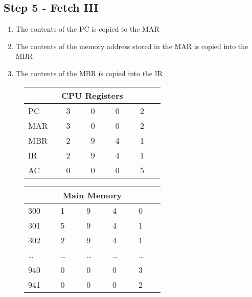 \subsection*{Step 5 - Fetch III}
\begin{enumerate}
    \item The contents of the PC is copied to the MAR
    \item The contents of the memory address stored in the MAR is copied into the MBR
    \item The contents of the MBR is copied into the IR
\end{enumerate}

\begin{figure}[H]
    \begin{minipage}[t]{0.45\textwidth}
        \centering
        \begin{tabular}[H]{p{0.15\linewidth} p{0.12\linewidth} p{0.12\linewidth} p{0.12\linewidth} p{0.12\linewidth}}
            \multicolumn{5}{c}{\textbf{CPU Registers}}\\
            \hline
            \hline
            PC & 3 & 0 & 0 & 2 \\
            \hline
            MAR & 3 & 0 & 0 & 2 \\
            \hline
            MBR & 2 & 9 & 4 & 1 \\
            \hline
            IR & 2 & 9 & 4 & 1 \\
            \hline
            AC & 0 & 0 & 0 & 5 \\
            \hline
        \end{tabular}
    \end{minipage}\hfill
    \begin{minipage}[t]{0.45\textwidth}
        \centering
        \begin{tabular}[H]{p{0.15\linewidth} p{0.12\linewidth} p{0.12\linewidth} p{0.12\linewidth} p{0.12\linewidth}}
            \multicolumn{5}{c}{\textbf{Main Memory}}\\
            \hline
            \hline
            300 & 1 & 9 & 4 & 0 \\
            \hline
            301 & 5 & 9 & 4 & 1 \\
            \hline
            302 & 2 & 9 & 4 & 1 \\
            \hline
            \ldots & \ldots & \ldots & \ldots & \ldots \\
            \hline
            940 & 0 & 0 & 0 & 3 \\
            \hline
            941 & 0 & 0 & 0 & 2 \\
            \hline
        \end{tabular}
    \end{minipage}\hfill
\end{figure}

